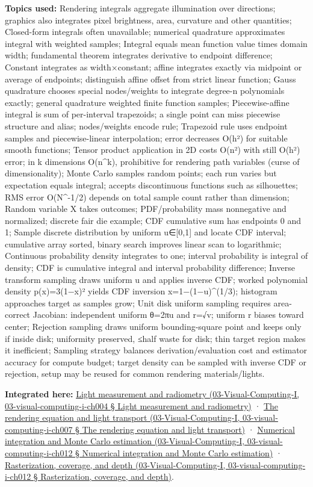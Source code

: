 \textbf{Topics used:} Rendering integrals aggregate illumination over directions; graphics also integrates pixel brightness, area, curvature and other quantities; Closed-form integrals often unavailable; numerical quadrature approximates integral with weighted samples; Integral equals mean function value times domain width; fundamental theorem integrates derivative to endpoint difference; Constant integrates as width×constant; affine integrates exactly via midpoint or average of endpoints; distinguish affine offset from strict linear function; Gauss quadrature chooses special nodes/weights to integrate degree-n polynomials exactly; general quadrature weighted finite function samples; Piecewise-affine integral is sum of per-interval trapezoids; a single point can miss piecewise structure and alias; nodes/weights encode rule; Trapezoid rule uses endpoint samples and piecewise-linear interpolation; error decreases O(h²) for suitable smooth functions; Tensor product application in 2D costs O(n²) with still O(h²) error; in k dimensions O(n\^{}k), prohibitive for rendering path variables (curse of dimensionality); Monte Carlo samples random points; each run varies but expectation equals integral; accepts discontinuous functions such as silhouettes; RMS error O(N\^{}-1/2) depends on total sample count rather than dimension; Random variable X takes outcomes; PDF/probability mass nonnegative and normalized; discrete fair die example; CDF cumulative sum has endpoints 0 and 1; Sample discrete distribution by uniform u∈{[}0,1{]} and locate CDF interval; cumulative array sorted, binary search improves linear scan to logarithmic; Continuous probability density integrates to one; interval probability is integral of density; CDF is cumulative integral and interval probability difference; Inverse transform sampling draws uniform u and applies inverse CDF; worked polynomial density p(x)=3(1−x)² yields CDF inversion x=1−(1−u)\^{}(1/3); histogram approaches target as samples grow; Unit disk uniform sampling requires area-correct Jacobian: independent uniform θ=2πu and r=√v; uniform r biases toward center; Rejection sampling draws uniform bounding-square point and keeps only if inside disk; uniformity preserved, ≤half waste for disk; thin target region makes it inefficient; Sampling strategy balances derivation/evaluation cost and estimator accuracy for compute budget; target density can be sampled with inverse CDF or rejection, setup may be reused for common rendering materials/lights.

\textbf{Integrated here:} \href{}{Light measurement and radiometry (03-Visual-Computing-I, 03-visual-computing-i-ch004 § Light measurement and radiometry)} · \href{}{The rendering equation and light transport (03-Visual-Computing-I, 03-visual-computing-i-ch007 § The rendering equation and light transport)} · \href{}{Numerical integration and Monte Carlo estimation (03-Visual-Computing-I, 03-visual-computing-i-ch012 § Numerical integration and Monte Carlo estimation)} · \href{}{Rasterization, coverage, and depth (03-Visual-Computing-I, 03-visual-computing-i-ch012 § Rasterization, coverage, and depth)}.

